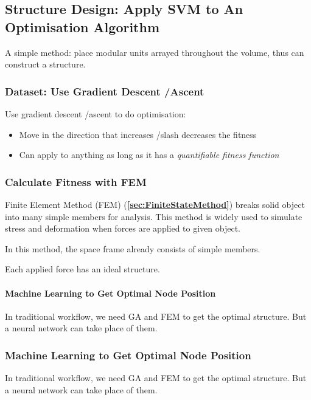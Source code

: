 \documentclass[a4paper, openany]{book}
\begin{document}
\subsection{Structure Design: Apply SVM to An Optimisation Algorithm}

A simple method: place modular units arrayed throughout the volume, thus can construct a structure.

\subsubsection{Dataset: Use Gradient Descent \slash Ascent}

Use gradient descent \slash ascent to do optimisation:

\begin{itemize}
  \item Move in the direction that increases /slash decreases the fitness
  \item Can apply to anything as long as it has a \textit{quantifiable fitness function}
\end{itemize}

\subsubsection{Calculate Fitness with FEM}

Finite Element Method (FEM) (\textbf{\cref{sec:FiniteStateMethod}}) breaks solid object into many simple members for analysis. This method is widely used to simulate stress and deformation when forces are applied to given object.

In this method, the space frame already consists of simple members.

Each applied force has an ideal structure.

\paragraph{Machine Learning to Get Optimal Node Position}

In traditional workflow, we need GA and FEM to get the optimal structure. But a neural network can take place of them.

\subsubsection{Machine Learning to Get Optimal Node Position}

In traditional workflow, we need GA and FEM to get the optimal structure. But a neural network can take place of them.
\end{document}
